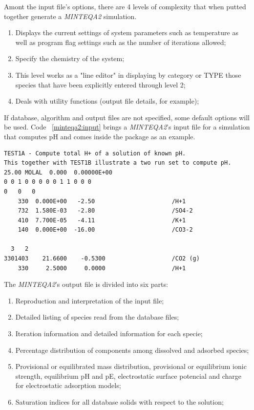 \documentclass[ppgc,mestrado,english]{iiufrgs}
\begin{document}
Amont the input file's options, there are 4 levels of complexity that when putted together generate a \emph{MINTEQA2} simulation. 
\begin{enumerate}
\item Displays the current settings of system parameters such as temperature as well as program flag settings such as the number of iterations allowed;
\item Specify the chemistry of the system;
\item This level works as a "line editor" in displaying by category or TYPE those species that have been explicitly entered through level 2;
\item Deals with utility functions (output file details, for example);
\end{enumerate}

If database, algorithm and output files are not specified, some default options will be used. Code ~\ref{minteqa2:input} brings a \emph{MINTEQA2}'s input file for a simulation that computes pH and comes inside the package as an example.

\begin{minipage}[c]{0.95\textwidth}
\begin{lstlisting}[frame=single, caption=\emph{MINTEQA2}'s input file, label=minteqa2:input]
TEST1A - Compute total H+ of a solution of known pH.              
This together with TEST1B illustrate a two run set to compute pH. 
25.00 MOLAL  0.000  0.00000E+00
0 0 1 0 0 0 0 0 1 1 0 0 0
0   0   0
    330  0.000E+00   -2.50                      /H+1               
    732  1.580E-03   -2.80                      /SO4-2             
    410  7.700E-05   -4.11                      /K+1               
    140  0.000E+00  -16.00                      /CO3-2             
  
  3   2
3301403    21.6600    -0.5300                   /CO2 (g)           
    330     2.5000     0.0000                   /H+1  
\end{lstlisting}
\end{minipage}


The \emph{MINTEQA2}'s output file is divided into six parts:
\begin{enumerate}
\item Reproduction and interpretation of the input file;
\item Detailed listing of species read from the database files;
\item Iteration information and detailed information for each specie;
\item Percentage distribution of components among dissolved and adsorbed species;
\item Provisional or equilibrated mass distribution, provisional or equilibrium ionic strength, equilibrium pH and pE, electrostatic surface potencial and charge for electrostatic adsorption models;
\item Saturation indices for all database solids with respect to the solution;
\end{enumerate}
\end{document}
